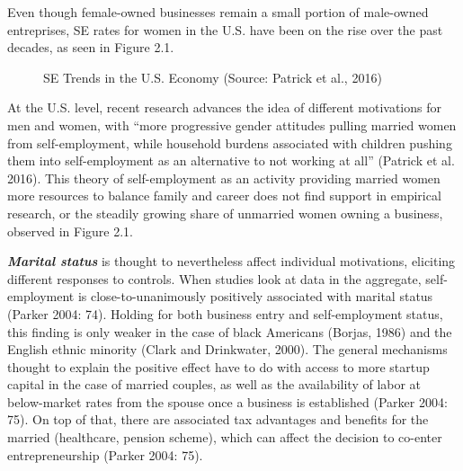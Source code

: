 Even though female-owned businesses remain a small portion of male-owned entreprises, SE rates for women in the U.S. have been on the rise over the past decades, as seen in Figure 2.1. 

\begin{figure}[hbtp]
        \caption{SE Trends in the U.S. Economy (Source: Patrick et al., 2016)}  
\end{figure}

At the U.S. level, recent research advances the idea of different motivations for men and women, with “more progressive gender attitudes pulling married women from self-employment, while household burdens associated with children pushing them into self-employment as an alternative to not working at all” (Patrick et al. 2016). This theory of self-employment as an activity providing married women more resources to balance family and career does not find support in empirical research, or the steadily growing share of unmarried women owning a business, observed in Figure 2.1.

\textbf{\textit{Marital status}} is thought to nevertheless affect individual motivations, eliciting different responses to controls. When studies look at data in the aggregate, self-employment is close-to-unanimously positively associated with marital status (Parker 2004: 74). Holding for both business entry and self-employment status, this finding is only weaker in the case of black Americans (Borjas, 1986) and the English ethnic minority (Clark and Drinkwater, 2000). The general mechanisms thought to explain the positive effect have to do with access to more startup capital in the case of married couples, as well as the availability of labor at below-market rates from the spouse once a business is established (Parker 2004: 75). On top of that, there are associated tax advantages and benefits for the married (healthcare, pension scheme), which can affect the decision to co-enter entrepreneurship (Parker 2004: 75).

